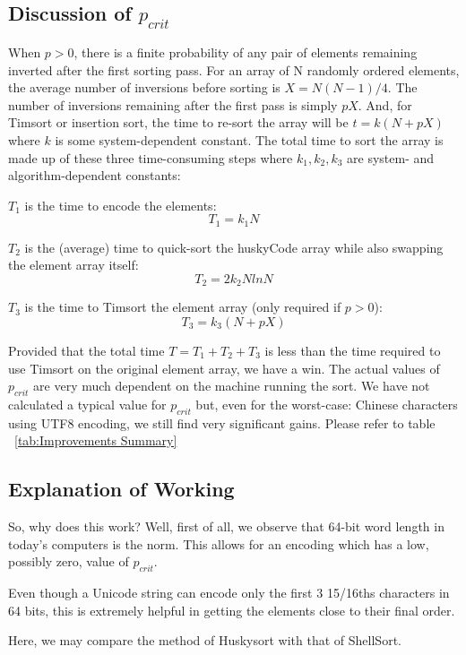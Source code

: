 \documentclass[acmtog]{acmart}
\begin{document}
\subsection{Discussion of $p_{crit}$}
When $p > 0$, there is a finite probability of any pair of elements remaining inverted after the first sorting pass.
For an array of N randomly ordered elements, the average number of inversions before sorting is $X = N (N -1 ) / 4$.
The number of inversions remaining after the first pass is simply $p X$.
And, for Timsort or insertion sort, the time to re-sort the array will be $t = k (N + p X)$ where $k$ is some system-dependent constant.
The total time to sort the array is made up of these three time-consuming steps where $k_1, k_2, k_3$ are system- and algorithm-dependent constants:

\begin{steps}
 \item{} $T_1$ is the time to encode the elements:
\[T_1 = k_1 N\]
\item{}  $T_2$ is the (average) time to quick-sort the huskyCode array while also swapping the element array itself:
\[T_2 = 2 k_2 N ln N\]
\item{}  $T_3$  is the time to Timsort the element array (only required if $p>0$):
 \[T_3 = k_3 (N + p X)\]
\end{steps}
Provided that the total time $T = T_1 + T_2 + T_3$ is less than the time required to use Timsort on the original element array, we have a win.
The actual values of $p_{crit}$ are very much dependent on the machine running the sort.
We have not calculated a typical value for $p_{crit}$ but, even for the worst-case: Chinese characters using UTF8 encoding, we still find very significant gains.
Please refer to table ~\ref{tab:Improvements Summary}	

\subsection{Explanation of Working}

So, why does this work? Well, first of all, we observe that 64-bit word length in today’s computers is the norm.
This allows for an encoding which has a low, possibly zero, value of $p_{crit}$.

Even though a Unicode string can encode only the first 3 15/16ths characters in 64 bits, this is extremely helpful in getting the elements close to their final order.

Here, we may compare the method of Huskysort with that of ShellSort.\cite{10.1007/3-540-61680-2_42}
\end{document}
